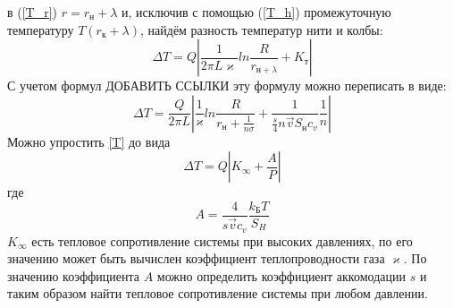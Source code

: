\documentclass[12pt]{article}
\begin{document}
        в (\ref{T_r}) $r = r_{\text{н}} + \lambda$ и, исключив с помощью (\ref{T_h}) промежуточную температуру $T(r_{\text{к}} + \lambda)$, найдём разность температур нити и колбы:
        \begin{equation}
            \Delta T = Q \left|\frac{1}{2\pi L \varkappa}ln\frac{R}{r_{\text{н}+\lambda}} + K_{\text{т}} \right|
        \end{equation}
        С учетом формул ДОБАВИТЬ ССЫЛКИ эту формулу можно переписать в виде:
        \begin{equation}\label{T}
            \Delta T = \frac{Q}{2\pi L}\left| \frac{1}{\varkappa}ln\frac{R}{r_{\text{н}}+\frac{1}{n\sigma}} +\frac{1}{\frac{s}{4} n \vec{v} S_{\text{н}}c_v} \frac{1}{n}\right|
        \end{equation}
        Можно упростить \ref{T} до вида
        \begin{equation}
            \Delta T = Q \left|K_{\infty} + \frac{A}{P}\right|
        \end{equation}
        где
        \[
            A = \frac{4}{s\vec{v}c_v}\frac{k_{\text{Б}}T}{S_H}
        \]
        $K_{\infty}$ есть тепловое сопротивление системы при высоких давлениях,
        по его значению может быть вычислен коэффициент теплопроводности газа $\varkappa$. По значению коэффициента $A$ можно определить коэффициент
        аккомодации $s$ и таким образом найти тепловое сопротивление системы при любом давлении.
\end{document}
